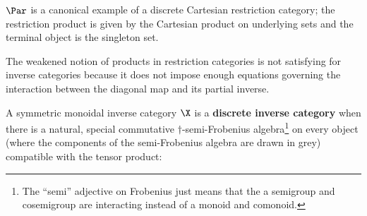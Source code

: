$\Par$ is a canonical example of a discrete Cartesian restriction category; the restriction product is given by the Cartesian product on underlying sets and the terminal object is  the singleton set.




The weakened notion of products in restriction categories is not satisfying for inverse categories because it does not impose enough equations governing the interaction between the diagonal map and its partial inverse.

\begin{definition}\cite[Def. 4.3.1]{giles}
A symmetric monoidal inverse category $\X$ is a {\bf discrete inverse category} when there is a natural, special commutative $\dag$-semi-Frobenius algebra\footnote{The ``semi'' adjective on Frobenius just means that the a semigroup and cosemigroup are interacting instead of a monoid and comonoid.} on every object (where the components of the semi-Frobenius algebra are drawn in grey)  compatible with the tensor product:


\end{definition}
